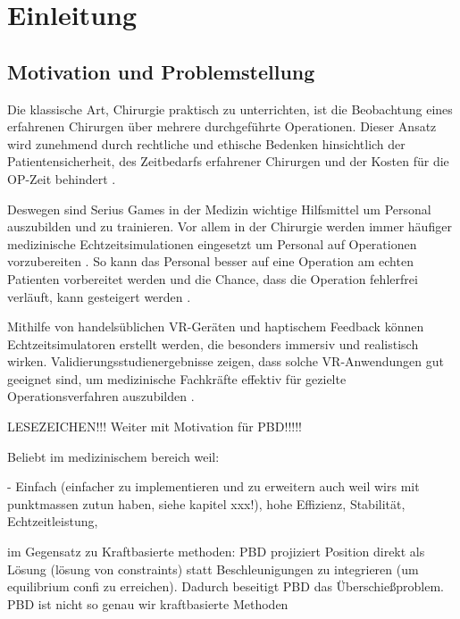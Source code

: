 \chapter{Einleitung}
\label{chap_Einleitung}



\section{Motivation und Problemstellung}


Die klassische Art, Chirurgie praktisch zu unterrichten, ist die Beobachtung eines erfahrenen Chirurgen über mehrere durchgeführte Operationen. Dieser Ansatz wird zunehmend durch rechtliche und ethische Bedenken hinsichtlich der Patientensicherheit, des Zeitbedarfs erfahrener Chirurgen und der Kosten für die OP-Zeit behindert \cite{SurgSim}.

Deswegen sind Serius Games in der Medizin wichtige Hilfsmittel um Personal auszubilden und zu trainieren. Vor allem in der Chirurgie werden immer häufiger medizinische Echtzeitsimulationen eingesetzt um Personal auf Operationen vorzubereiten \cite{SimRole}. So kann das Personal besser auf eine Operation am echten Patienten vorbereitet werden und die Chance, dass die Operation fehlerfrei verläuft, kann gesteigert werden \cite{VRNeuro}.

Mithilfe von handelsüblichen VR-Geräten und haptischem Feedback können Echtzeitsimulatoren erstellt werden, die besonders immersiv und realistisch wirken. Validierungsstudienergebnisse zeigen, dass solche VR-Anwendungen gut geeignet sind, um medizinische Fachkräfte effektiv für gezielte Operationsverfahren auszubilden \cite{VRSim20}.



LESEZEICHEN!!! Weiter mit Motivation für \ac{PBD}!!!!!

Beliebt im medizinischem bereich weil:

- Einfach (einfacher zu implementieren und zu erweitern auch weil wirs mit punktmassen zutun haben, siehe kapitel xxx!), hohe Effizienz, Stabilität, Echtzeitleistung, 

im Gegensatz zu Kraftbasierte methoden: PBD projiziert Position direkt als Lösung (lösung von constraints) statt Beschleunigungen zu integrieren (um equilibrium confi zu erreichen). Dadurch beseitigt PBD das Überschießproblem. PBD ist nicht so genau wir kraftbasierte Methoden

